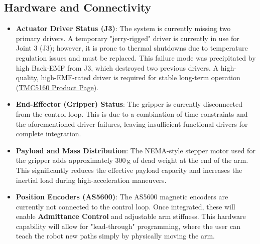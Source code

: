\documentclass[12pt,a4paper]{report}
\begin{document}
\subsection{Hardware and Connectivity}
\begin{itemize}
    \item \textbf{Actuator Driver Status (J3)}: The system is currently missing two primary drivers. A temporary "jerry-rigged" driver is currently in use for Joint 3 (J3); however, it is prone to thermal shutdowns due to temperature regulation issues and must be replaced. This failure mode was precipitated by high Back-EMF from J3, which destroyed two previous drivers. A high-quality, high-EMF-rated driver is required for stable long-term operation (\href{https://biqu.equipment/products/bigtreetech-tmc5160-v1-0-driver-spi-mode-silent-high-precision-stepstick-stepper-motor-driver-with-heatsink-for-skr-v1-3-gen-v1-4-reprap?variant=40301979598946}{TMC5160 Product Page}).
    \item \textbf{End-Effector (Gripper) Status}: The gripper is currently disconnected from the control loop. This is due to a combination of time constraints and the aforementioned driver failures, leaving insufficient functional drivers for complete integration.
    \item \textbf{Payload and Mass Distribution}: The NEMA-style stepper motor used for the gripper adds approximately 300\,g of dead weight at the end of the arm. This significantly reduces the effective payload capacity and increases the inertial load during high-acceleration maneuvers. 
    \item \textbf{Position Encoders (AS5600)}: The AS5600 magnetic encoders are currently not connected to the control loop. Once integrated, these will enable \textbf{Admittance Control} and adjustable arm stiffness. This hardware capability will allow for "lead-through" programming, where the user can teach the robot new paths simply by physically moving the arm.
\end{itemize}
\end{document}
